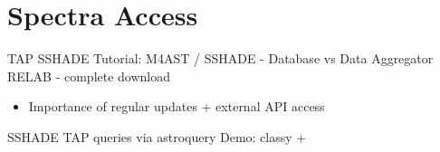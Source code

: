 \section{Spectra Access}
\label{sec:spectra_access}


\begin{frame}[t]{}
TAP
SSHADE
  Tutorial: M4AST / SSHADE - Database vs Data Aggregator
RELAB - complete download
  \begin{itemize}
    \item Importance of regular updates + external API access
  \end{itemize}
\end{frame}

\begin{frame}[t]{}
SSHADE TAP queries via astroquery
  Demo: classy +
\end{frame}

